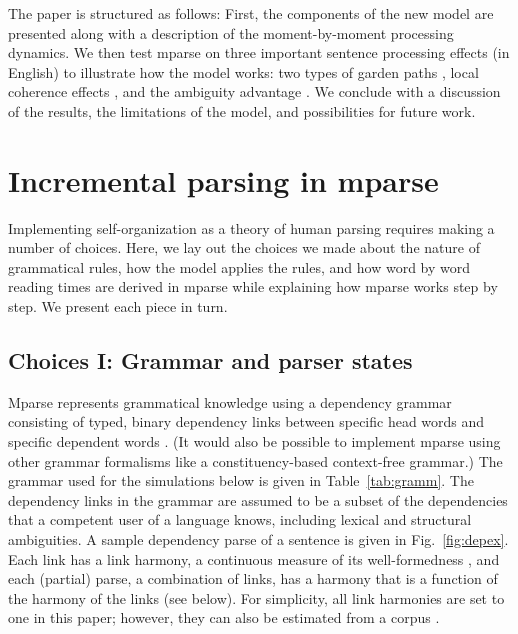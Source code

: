 \documentclass[a4paper, 12pt]{article}
\begin{document}
The paper is structured as follows: First, the components of the new model are
presented along with a description of the moment-by-moment processing dynamics.
We then test mparse on three important sentence processing effects (in English)
to illustrate how the model works: two types of garden paths \citep[NP/S and
NP/Z;][]{sturt1999structural}, local coherence effects \citep{tabor2004effects},
and the ambiguity advantage \citep{vangompel2000unrestricted,
    traxler1998adjunct, vangompel2001reanalysis, vangompel2005evidence}. We
conclude with a discussion of the results, the limitations of the model, and
possibilities for future work.

\section{Incremental parsing in mparse}
Implementing self-organization as a theory of human parsing requires making a
number of choices. Here, we lay out the choices we made about the nature of
grammatical rules, how the model applies the rules, and how word by word
reading times are derived in mparse while explaining how mparse works step by
step. We present each piece in turn.

\subsection{Choices I: Grammar and parser states}
Mparse represents grammatical knowledge using a dependency grammar consisting
of typed, binary dependency links between specific head words and specific
dependent words \citep{hays1964dependency, gaifman1965dependency,
    demarneffe2019dependency}.  (It would also be possible to implement mparse
using other grammar formalisms like a constituency-based context-free grammar.)
The grammar used for the simulations below is given in Table~\ref{tab:gramm}.
The dependency links in the grammar are assumed to be a subset of the
dependencies that a competent user of a language knows, including lexical and
structural ambiguities. A sample dependency parse of a sentence is given in
Fig.~\ref{fig:depex}. Each link has a link harmony, a continuous measure of its
well-formedness \citep[higher harmony means more
well-formed;][]{smolensky1986information}, and each (partial) parse, a
combination of links, has a harmony that is a function of the harmony of the
links (see below). For simplicity, all link harmonies are set to one in this
paper; however, they can also be estimated from a corpus
\citep[e.g.,][]{smith2020principled}.
\end{document}
